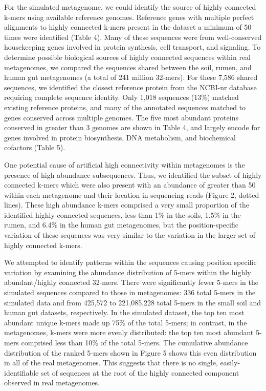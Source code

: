 \documentclass[10pt]{article}
\begin{document}
For the simulated metagenome, we could identify the source of highly
connected k-mers using available reference genomes. Reference genes
with multiple perfect alignments to highly connected k-mers present in
the dataset a minimum of 50 times were identified (Table 4).  Many of
these sequences were from well-conserved housekeeping genes involved
in protein synthesis, cell transport, and signaling.  To determine
possible biological sources of highly connected sequences within real
metagenomes, we compared the sequences shared between the soil, rumen,
and human gut metagenomes (a total of 241 million 32-mers).  For these 7,586 shared sequences, we identified the closest reference
protein from the NCBI-nr database requiring complete sequence
identity.  Only 1,018 sequences (13\%) matched existing reference
proteins, and many of the annotated sequences matched to
genes conserved across multiple genomes.  The five most abundant
proteins conserved in greater than 3 genomes are shown in Table 4, and
largely encode for genes involved in protein biosynthesis, DNA
metabolism, and biochemical cofactors (Table 5).

One potential cause of artificial high connectivity within metagenomes
is the presence of high abundance subsequences.  Thus, we identified the
subset of highly connected k-mers which were also present with an
abundance of greater than 50 within each metagenome and their location
in sequencing reads (Figure 2, dotted lines).  These high abundance
k-mers comprised a very small proportion of the identified highly
connected sequences, less than 1\% in the soils, 1.5\% in the rumen,
and 6.4\% in the human gut metagenomes, but the position-specific
variation of these sequences was very similar to the variation in the
larger set of highly connected k-mers.

We attempted to identify patterns within the sequences causing
position specific variation by examining the abundance distribution of
5-mers within the highly abundant/highly connected 32-mers.  There
were significantly fewer 5-mers in the simulated sequences compared to
those in metagenomes: 336 total 5-mers in the simulated data and from
425,572 to 221,085,228 total 5-mers in the small soil and human gut
datasets, respectively.  In the simulated dataset, the top ten most
abundant unique k-mers made up 75\% of the total 5-mers; in contrast,
in the metagenomes, k-mers were more evenly distributed: the top ten
most abundant 5-mers comprised less than 10\% of the total 5-mers.
The cumulative abundance distribution of the ranked 5-mers shown in
Figure 5 shows this even distribution in all of the real metagenomes.
This suggests that there is no single, easily-identifiable set of
sequences at the root of the highly connected component observed in
real metagenomes.
\end{document}
